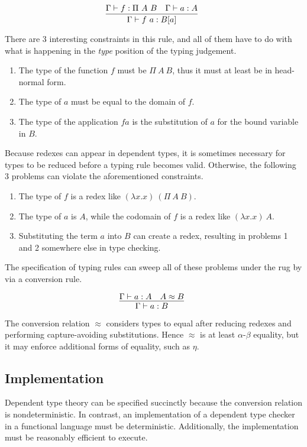 \documentclass[preprint,authoryear]{sigplanconf}
\def\turn{\vdash}
\def\conv{\approx}
\begin{document}
$$
\infer[]
  {\Gamma \turn f~a : B[a]}
{
  \Gamma \turn f : \Pi~A~B
  &
  \Gamma \turn a : A
}
$$

There are 3 interesting
constraints in this rule, and all of them have to do with what is
happening in the {\it type} position of the typing judgement.

\begin{enumerate}
\item The type of the function $f$ must be $\Pi~A~B$, thus it must at
  least be in head-normal form.
\item The type of $a$ must be equal to the domain of $f$.
\item The type of the application $f a$ is the substitution of $a$ for
  the bound variable in $B$.
\end{enumerate}

Because redexes can appear in dependent types, it is sometimes
necessary for types to be reduced before a typing rule becomes valid.
Otherwise, the following 3 problems can violate the aforementioned
constraints.

\begin{enumerate}
\item The type of $f$ is a redex like $(\lambda x. x)~(\Pi~A~B)$.
\item The type of $a$ is $A$, while the codomain of $f$ is a redex like
$(\lambda x. x)~A$.
\item Substituting the term $a$ into $B$ can create a redex, resulting
  in problems 1 and 2 somewhere else in type checking.
\end{enumerate}

The specification of typing rules can sweep all of these
problems under the rug by via a conversion rule.

$$
\infer[]
  {\Gamma \turn a : B}
{
  \Gamma \turn a : A
  &
  A \conv B
}
$$

The conversion relation $\conv$ considers types to equal after
reducing redexes and performing capture-avoiding substitutions. Hence $\conv$ is at least $\alpha$-$\beta$
equality, but it may enforce additional forms of equality, such as $\eta$.

\subsection{Implementation}

Dependent type theory can be specified succinctly because the
conversion relation is nondeterministic. In contrast, an
implementation of a dependent type checker in a functional language
must be deterministic. Additionally, the implementation must be
reasonably efficient to execute. 
\end{document}
